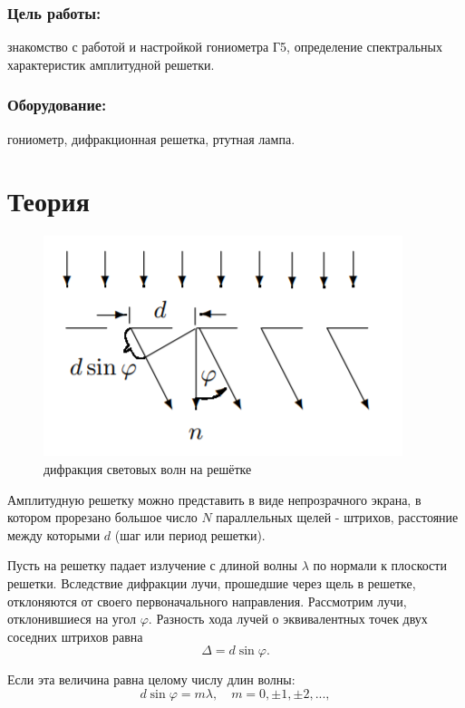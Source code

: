 \documentclass[a4paper,12pt]{article}
\begin{document}
\subsubsection*{Цель работы:}знакомство с работой и настройкой гониометра Г5, определение спектральных характеристик амплитудной решетки.

\subsubsection*{Оборудование:} гониометр, дифракционная решетка, ртутная лампа. 

\section*{Теория}

\begin{figure}
	\includegraphics[scale = 0.9]{img1}
	\caption{дифракция световых волн на решётке}
\end{figure}

Амплитудную решетку можно представить в виде непрозрачного экрана, в котором прорезано большое число $N$ параллельных щелей - штрихов, расстояние между которыми $d$ (шаг или период решетки).

Пусть на решетку падает излучение с длиной волны $\lambda$ по нормали к плоскости решетки. Вследствие дифракции лучи, прошедшие через щель в решетке, отклоняются от своего первоначального направления. Рассмотрим лучи, отклонившиеся на угол $\varphi$. Разность хода лучей о эквивалентных точек двух соседних штрихов равна 
\begin{equation}
	\Delta = d \sin \varphi .
	\label{eq:dif1}
\end{equation}

\noindent Если эта величина равна целому числу длин волны:
\begin{equation}
	d \sin \varphi = m \lambda, \quad m = 0, \pm 1, \pm 2, ... ,
	\label{eq:dif2}
\end{equation}
\end{document}
